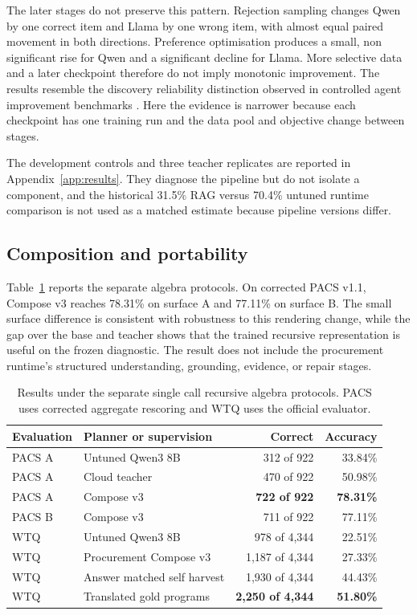 \documentclass{article}
\begin{document}
The later stages do not preserve this pattern.  Rejection sampling changes Qwen by one correct item
and Llama by one wrong item, with almost equal paired movement in both directions.  Preference
optimisation produces a small, non significant rise for Qwen and a significant decline for Llama.
More selective data and a later checkpoint therefore do not imply monotonic improvement.  The
results resemble the discovery reliability distinction observed in controlled agent improvement
benchmarks \citep{meng2026rsibench}.  Here the evidence is narrower because each checkpoint has one
training run and the data pool and objective change between stages.

The development controls and three teacher replicates are reported in Appendix~\ref{app:results}.
They diagnose the pipeline but do not isolate a component, and the historical 31.5\% RAG versus
70.4\% untuned runtime comparison is not used as a matched estimate because pipeline versions differ.

\subsection{Composition and portability}

Table~\ref{tab:external} reports the separate algebra protocols.  On corrected PACS v1.1,
Compose v3 reaches 78.31\% on surface A and 77.11\% on surface B.  The small surface difference is
consistent with robustness to this rendering change, while the gap over the base and teacher shows
that the trained recursive representation is useful on the frozen diagnostic.  The result does not
include the procurement runtime's structured understanding, grounding, evidence, or repair stages.

\begin{table}[t]
  \centering
  \caption{Results under the separate single call recursive algebra protocols.  PACS uses corrected
  aggregate rescoring and WTQ uses the official evaluator.}
  \label{tab:external}
  \small
  \begin{tabular}{llrr}
    \toprule
    Evaluation & Planner or supervision & Correct & Accuracy \\
    \midrule
    PACS A & Untuned Qwen3 8B & 312 of 922 & 33.84\% \\
    PACS A & Cloud teacher & 470 of 922 & 50.98\% \\
    PACS A & Compose v3 & \textbf{722 of 922} & \textbf{78.31\%} \\
    PACS B & Compose v3 & 711 of 922 & 77.11\% \\
    \midrule
    WTQ & Untuned Qwen3 8B & 978 of 4,344 & 22.51\% \\
    WTQ & Procurement Compose v3 & 1,187 of 4,344 & 27.33\% \\
    WTQ & Answer matched self harvest & 1,930 of 4,344 & 44.43\% \\
    WTQ & Translated gold programs & \textbf{2,250 of 4,344} & \textbf{51.80\%} \\
    \bottomrule
  \end{tabular}
\end{table}
\end{document}
